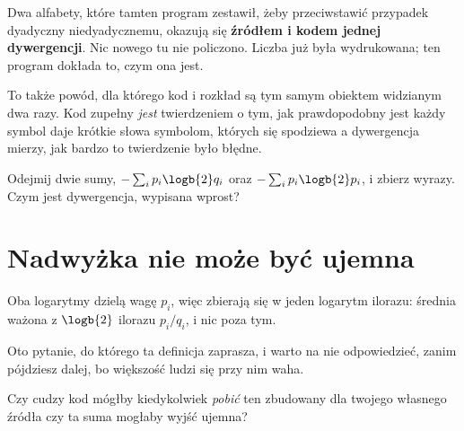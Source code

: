 \begin{fr}

Dwa alfabety, które tamten program zestawił, żeby przeciwstawić przypadek
dyadyczny niedyadycznemu, okazują się \textbf{źródłem i kodem jednej
dywergencji}. Nic nowego tu nie policzono. Liczba już była wydrukowana; ten
program dokłada to, czym ona jest.

\begin{note}
To także powód, dla którego kod i rozkład są tym samym obiektem widzianym
dwa razy. Kod zupełny \emph{jest} twierdzeniem o tym, jak prawdopodobny jest
każdy symbol \dash{} daje krótkie słowa symbolom, których się spodziewa
\dash{} a dywergencja mierzy, jak bardzo to twierdzenie było błędne.
\end{note}


Odejmij dwie sumy, $-\sum_i p_i \logb{2} q_i$ oraz
$-\sum_i p_i \logb{2} p_i$, i zbierz wyrazy. Czym jest dywergencja, wypisana
wprost?
\dotline
\nextframe
\end{fr}

\section{Nadwyżka nie może być ujemna}
\label{sec:P30-nonneg}

\begin{fr}

Oba logarytmy dzielą wagę $p_i$, więc zbierają się w jeden logarytm ilorazu:
średnia ważona z $\logb{2}$ ilorazu $p_i / q_i$, i nic poza tym.

Oto pytanie, do którego ta definicja zaprasza, i warto na nie odpowiedzieć,
zanim pójdziesz dalej, bo większość ludzi się przy nim waha.

Czy cudzy kod mógłby kiedykolwiek \emph{pobić} ten zbudowany dla twojego
własnego źródła \dash{} czy ta suma mogłaby wyjść ujemna?
\dotline
\nextframe
\end{fr}

